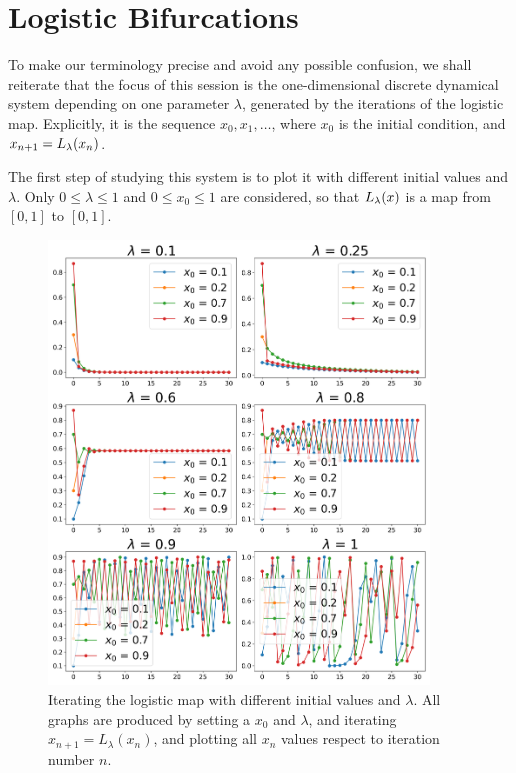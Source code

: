 \section{Logistic Bifurcations}

To make our terminology precise and avoid any possible confusion, we shall reiterate that the focus of this session is the one-dimensional discrete dynamical system depending on one parameter $\lambda$, generated by the iterations of the logistic map. 
Explicitly, it is the sequence $x_0, x_1, \dots$, where $x_0$ is the initial condition, and $x_{n+1} = L_{\lambda}(x_n)$.

The first step of studying this system is to plot it with different initial values and $\lambda$. Only $0 \leq \lambda \leq 1$ and $0 \leq x_0 \leq 1$ are considered, so that $L_{\lambda}(x)$ is a map from $[0,1]$ to $[0,1]$. 

\begin{figure}[htbp]
	\centering
	\includegraphics[width=0.9\textwidth]{./figures/various_iterating_logistic_map.png}
	\caption{Iterating the logistic map with different initial values and $\lambda$. All graphs are produced by setting a $x_0$ and $\lambda$, and iterating $x_{n+1} = L_{\lambda}(x_n)$, and plotting all $x_n$ values respect to iteration number $n$.}
	\label{fig:various_iter_logistic}
\end{figure}

